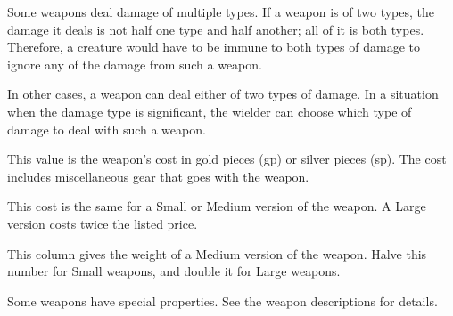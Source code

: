         Some weapons deal damage of multiple types. If a weapon is of two types, the damage it deals is not half one type and half another; all of it is both types. Therefore, a creature would have to be immune to both types of damage to ignore any of the damage from such a weapon.

        In other cases, a weapon can deal either of two types of damage. In a situation when the damage type is significant, the wielder can choose which type of damage to deal with such a weapon.

         This value is the weapon's cost in gold pieces (gp) or silver pieces (sp). The cost includes miscellaneous gear that goes with the weapon.
        \par This cost is the same for a Small or Medium version of the weapon. A Large version costs twice the listed price.

         This column gives the weight of a Medium version of the weapon. Halve this number for Small weapons, and double it for Large weapons.

         Some weapons have special properties. See the weapon
            descriptions for details.

